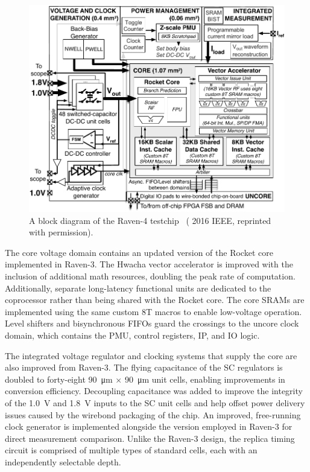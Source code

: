 \documentclass[graybox]{svmult}
\begin{document}
\begin{figure}
  \centering
  \includegraphics[width=\textwidth]{6-raven4-blockdiagram}
  \caption{A block diagram of the Raven-4 testchip~\cite{Keller2016} ({\textcopyright} 2016 IEEE, reprinted with permission).}
  \label{fig:6-raven4-blockdiagram}
\end{figure}

The core voltage domain contains an updated version of the Rocket core implemented in Raven-3.
The Hwacha vector accelerator is improved with the inclusion of additional math resources, doubling the peak rate of computation.
Additionally, separate long-latency functional units are dedicated to the coprocessor rather than being shared with the Rocket core.
The core SRAMs are implemented using the same custom 8T macros to enable low-voltage operation.
Level shifters and bisynchronous FIFOs guard the crossings to the uncore clock domain, which contains the PMU, control registers, IP, and IO logic.

The integrated voltage regulator and clocking systems that supply the core are also improved from Raven-3.
The flying capacitance of the SC regulators is doubled to forty-eight \SI{90}{\micro\meter} $\times$ \SI{90}{\micro\meter} unit cells, enabling improvements in conversion efficiency.
Decoupling capacitance was added to improve the integrity of the \SI{1.0}{\volt} and \SI{1.8}{\volt} inputs to the SC unit cells and help offset power delivery issues caused by the wirebond packaging of the chip.
An improved, free-running clock generator is implemented alongside the version employed in Raven-3 for direct measurement comparison.
Unlike the Raven-3 design, the replica timing circuit is comprised of multiple types of standard cells, each with an independently selectable depth.
\end{document}
